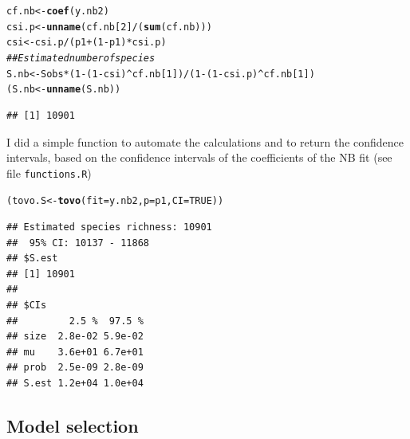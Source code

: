 \documentclass[12pt, A4]{article}\usepackage[]{graphicx}\usepackage[]{color}
\makeatletter
\newcommand{\hlnum}[1]{\textcolor[rgb]{0.686,0.059,0.569}{#1}}%
\newcommand{\hlcom}[1]{\textcolor[rgb]{0.678,0.584,0.686}{\textit{#1}}}%
\newcommand{\hlopt}[1]{\textcolor[rgb]{0,0,0}{#1}}%
\newcommand{\hlstd}[1]{\textcolor[rgb]{0.345,0.345,0.345}{#1}}%
\newcommand{\hlkwb}[1]{\textcolor[rgb]{0.69,0.353,0.396}{#1}}%
\newcommand{\hlkwc}[1]{\textcolor[rgb]{0.333,0.667,0.333}{#1}}%
\newcommand{\hlkwd}[1]{\textcolor[rgb]{0.737,0.353,0.396}{\textbf{#1}}}%
\newenvironment{kframe}{%
 \def\at@end@of@kframe{}%
 \ifinner\ifhmode%
  \def\at@end@of@kframe{\end{minipage}}%
  \begin{minipage}{\columnwidth}%
 \fi\fi%
 \def\FrameCommand##1{\hskip\@totalleftmargin \hskip-\fboxsep
 \colorbox{shadecolor}{##1}\hskip-\fboxsep
     \hskip-\linewidth \hskip-\@totalleftmargin \hskip\columnwidth}%
 \MakeFramed {\advance\hsize-\width
   \@totalleftmargin\z@ \linewidth\hsize
   \@setminipage}}%
 {\par\unskip\endMakeFramed%
 \at@end@of@kframe}
\newenvironment{knitrout}{}{} %
\newcommand{\code}[1]{\texttt{#1}}
\makeatother
\begin{document}
 
\begin{knitrout}
\color{fgcolor}\begin{kframe}
\begin{alltt}
\hlstd{cf.nb} \hlkwb{<-} \hlkwd{coef}\hlstd{(y.nb2)}
\hlstd{csi.p} \hlkwb{<-} \hlkwd{unname}\hlstd{(cf.nb[}\hlnum{2}\hlstd{]}\hlopt{/}\hlstd{(}\hlkwd{sum}\hlstd{(cf.nb)))}
\hlstd{csi} \hlkwb{<-} \hlstd{csi.p}\hlopt{/}\hlstd{(p1}\hlopt{+}\hlstd{(}\hlnum{1}\hlopt{-}\hlstd{p1)}\hlopt{*}\hlstd{csi.p)}
\hlcom{## Estimated number of species }
\hlstd{S.nb} \hlkwb{<-} \hlstd{Sobs}\hlopt{*}\hlstd{(}\hlnum{1}\hlopt{-}\hlstd{(}\hlnum{1}\hlopt{-}\hlstd{csi)}\hlopt{^}\hlstd{cf.nb[}\hlnum{1}\hlstd{])} \hlopt{/} \hlstd{(}\hlnum{1}\hlopt{-}\hlstd{(}\hlnum{1}\hlopt{-}\hlstd{csi.p)}\hlopt{^}\hlstd{cf.nb[}\hlnum{1}\hlstd{])}
\hlstd{(S.nb} \hlkwb{<-} \hlkwd{unname}\hlstd{(S.nb))}
\end{alltt}
\begin{verbatim}
## [1] 10901
\end{verbatim}
\end{kframe}
\end{knitrout}

I did a simple function to automate the calculations and to return
the confidence intervals, based on the confidence intervals of the 
coefficients of the NB fit (see file \code{functions.R})

 
\begin{knitrout}
\color{fgcolor}\begin{kframe}
\begin{alltt}
\hlstd{(tovo.S} \hlkwb{<-} \hlkwd{tovo}\hlstd{(}\hlkwc{fit} \hlstd{= y.nb2,} \hlkwc{p} \hlstd{= p1,} \hlkwc{CI}\hlstd{=}\hlnum{TRUE}\hlstd{))}
\end{alltt}
\begin{verbatim}
## Estimated species richness: 10901 
##  95% CI: 10137 - 11868
## $S.est
## [1] 10901
## 
## $CIs
##         2.5 %  97.5 %
## size  2.8e-02 5.9e-02
## mu    3.6e+01 6.7e+01
## prob  2.5e-09 2.8e-09
## S.est 1.2e+04 1.0e+04
\end{verbatim}
\end{kframe}
\end{knitrout}


\subsection*{Model selection}
\end{document}
